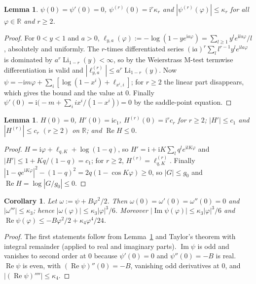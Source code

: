\documentclass[11pt]{amsart}
\newtheorem{lemma}[theorem]{Lemma}
\newtheorem{corollary}[theorem]{Corollary}
\theoremstyle{definition}
\theoremstyle{remark}
\numberwithin{equation}{section}
\newcommand{\RR}{\mathbb{R}}
\newcommand{\Li}{\operatorname{Li}}
\newcommand{\re}{\operatorname{Re}}
\newcommand{\im}{\operatorname{Im}}
\newcommand{\ii}{\mathrm{i}}
\begin{document}
\begin{lemma}\label{lem:psider}
$\psi(0)=\psi'(0)=0$, $\psi^{(r)}(0)=\ii^r\kappa_r$ and $|\psi^{(r)}(\varphi)|\le\kappa_r$ for all $\varphi\in\RR$ and $r\ge2$.
\end{lemma}

\begin{proof}
For $0<y<1$ and $a>0$, $\ell_{y,a}(\varphi):=-\log(1-ye^{\ii a\varphi})=\sum_{l\ge1}y^le^{\ii la\varphi}/l$, absolutely and uniformly.
The $r$-times differentiated series $(\ii a)^r\sum_ll^{r-1}y^le^{\ii la\varphi}$ is dominated by $a^r\Li_{1-r}(y)<\infty$, so by the
Weierstrass M-test termwise differentiation is valid and $|\ell_{y,a}^{(r)}|\le a^r\Li_{1-r}(y)$. Now
$\psi=-\ii m\varphi+\sum_i[\log(1-x^i)+\ell_{x^i,i}]$; for $r\ge2$ the linear part disappears, which gives the bound and the value at $0$.
Finally $\psi'(0)=\ii\bigl(-m+\sum_i ix^i/(1-x^i)\bigr)=0$ by the saddle-point equation.
\end{proof}

\begin{lemma}\label{lem:Hder}
$H(0)=0$, $H'(0)=\ii c_1$, $H^{(r)}(0)=\ii^rc_r$ for $r\ge2$; $|H'|\le c_1$ and $|H^{(r)}|\le c_r$ $(r\ge2)$ on $\RR$; and $\re H\le0$.
\end{lemma}

\begin{proof}
$H=\ii\varphi+\ell_{q,K}+\log(1-q)$, so $H'=\ii+\ii K\sum_lq^le^{\ii lK\varphi}$ and $|H'|\le1+Kq/(1-q)=c_1$; for $r\ge2$,
$H^{(r)}=\ell_{q,K}^{(r)}$. Finally $|1-qe^{\ii K\varphi}|^2-(1-q)^2=2q(1-\cos K\varphi)\ge0$, so $|G|\le g_0$ and $\re H=\log|G/g_0|\le0$.
\end{proof}

\begin{corollary}\label{cor:omega}
Let $\omega:=\psi+B\varphi^2/2$. Then $\omega(0)=\omega'(0)=\omega''(0)=0$ and $|\omega'''|\le\kappa_3$; hence $|\omega(\varphi)|\le\kappa_3|\varphi|^3/6$.
Moreover $|\im\psi(\varphi)|\le\kappa_3|\varphi|^3/6$ and $\re\psi(\varphi)\le-B\varphi^2/2+\kappa_4\varphi^4/24$.
\end{corollary}

\begin{proof}
The first statements follow from Lemma~\ref{lem:psider} and Taylor's theorem with integral remainder (applied to real and
imaginary parts). $\im\psi$ is odd and vanishes to second order at $0$ because $\psi'(0)=0$ and $\psi''(0)=-B$ is real.
$\re\psi$ is even, with $(\re\psi)''(0)=-B$, vanishing odd derivatives at $0$, and $|(\re\psi)''''|\le\kappa_4$.
\end{proof}
\end{document}
